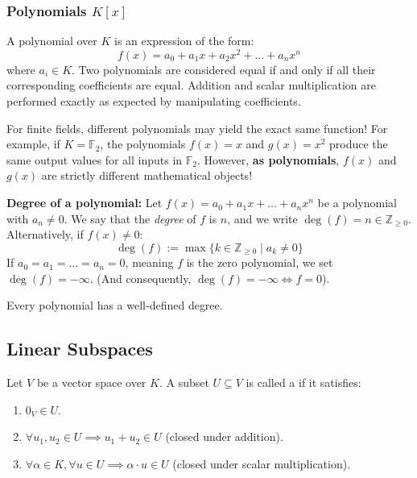 \subsubsection{Polynomials $K[x]$}
\begin{example}
A polynomial over $K$ is an expression of the form:
\[
f(x) = a_0 + a_1 x + a_2 x^2 + \dots + a_n x^n
\]
where $a_i \in K$. Two polynomials are considered equal if and only if all their corresponding coefficients are equal. Addition and scalar multiplication are performed exactly as expected by manipulating coefficients.

\begin{importantremark}
For finite fields, different polynomials may yield the exact same function! For example, if $K = \mathbb{F}_2$, the polynomials $f(x) = x$ and $g(x) = x^2$ produce the same output values for all inputs in $\mathbb{F}_2$. However, \textbf{as polynomials}, $f(x)$ and $g(x)$ are strictly different mathematical objects!
\end{importantremark}

\textbf{Degree of a polynomial:}
Let $f(x) = a_0 + a_1 x + \dots + a_n x^n$ be a polynomial with $a_n \ne 0$. We say that the \textit{degree} of $f$ is $n$, and we write $\deg(f) = n \in \mathbb{Z}_{\ge 0}$.
Alternatively, if $f(x) \ne 0$:
\[
\deg(f) := \max \{k \in \mathbb{Z}_{\ge 0} \mid a_k \ne 0\}
\]
If $a_0 = a_1 = \dots = a_n = 0$, meaning $f$ is the zero polynomial, we set $\deg(f) = -\infty$. (And consequently, $\deg(f) = -\infty \iff f = 0$).

\begin{remark}
Every polynomial has a well-defined degree.
\end{remark}
\end{example}

\subsection{Linear Subspaces}

\begin{definition}
Let $V$ be a vector space over $K$. A subset $U \subseteq V$ is called a  if it satisfies:
\begin{enumerate}
    \item $0_V \in U$.
    \item $\forall u_1, u_2 \in U \implies u_1 + u_2 \in U$ (closed under addition).
    \item $\forall \alpha \in K, \forall u \in U \implies \alpha \cdot u \in U$ (closed under scalar multiplication).
\end{enumerate}
\end{definition}

